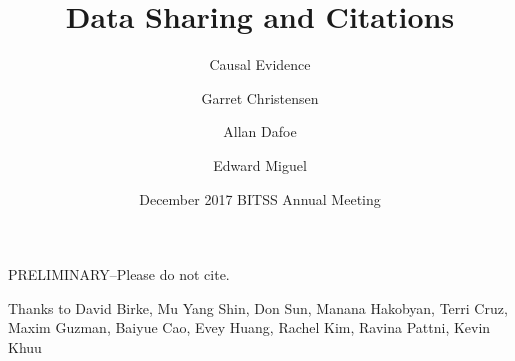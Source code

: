 \documentclass{beamer}
\title[Data Sharing and Citations] %
{Data Sharing and Citations}
\subtitle
{Causal Evidence} %
\author[Christensen, Dafoe, Miguel] %
{Garret Christensen\inst{1} \and Allan Dafoe\inst{2} \and Edward Miguel\inst{3}}
\institute[Universities of Somewhere and Elsewhere] %
{
  \inst{1}%
  Berkeley Institute for Data Science, UC Berkeley
  \and
  \inst{2}%
  Department of Political Science, Yale University
  \and
  \inst{3}%
  Department of Economics, UC Berkeley}
\date[Short Occasion] %
{December 2017 BITSS Annual Meeting}
\begin{document}
{ %
    \begin{frame}[plain]
     \end{frame}
}

\begin{frame}
  \titlepage
  \begin{center}
  \begin{large}
  PRELIMINARY--Please do not cite.
  \end{large}
  \end{center}
\end{frame}

\begin{frame}
Thanks to David Birke, Mu Yang Shin, Don Sun, Manana Hakobyan, Terri Cruz, Maxim Guzman, Baiyue Cao, Evey Huang, Rachel Kim, Ravina Pattni, Kevin Khuu
\end{frame}

\end{document}
